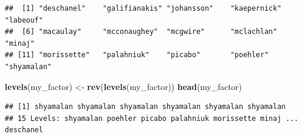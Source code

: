 \documentclass[
]{book}
\newenvironment{Shaded}{\begin{snugshade}}{\end{snugshade}}
\newcommand{\DataTypeTok}[1]{\textcolor[rgb]{0.13,0.29,0.53}{#1}}
\newcommand{\KeywordTok}[1]{\textcolor[rgb]{0.13,0.29,0.53}{\textbf{#1}}}
\newcommand{\NormalTok}[1]{#1}
\newcommand{\OperatorTok}[1]{\textcolor[rgb]{0.81,0.36,0.00}{\textbf{#1}}}
\newcommand{\StringTok}[1]{\textcolor[rgb]{0.31,0.60,0.02}{#1}}
\begin{document}
\begin{verbatim}
##  [1] "deschanel"    "galifianakis" "johansson"    "kaepernick"   "labeouf"     
##  [6] "macaulay"     "mcconaughey"  "mcgwire"      "mclachlan"    "minaj"       
## [11] "morissette"   "palahniuk"    "picabo"       "poehler"      "shyamalan"
\end{verbatim}

\begin{Shaded}
\begin{Highlighting}[]
\KeywordTok{levels}\NormalTok{(my_factor) <-}\StringTok{ }\KeywordTok{rev}\NormalTok{(}\KeywordTok{levels}\NormalTok{(my_factor))}
\KeywordTok{head}\NormalTok{(my_factor)}
\end{Highlighting}
\end{Shaded}

\begin{verbatim}
## [1] shyamalan shyamalan shyamalan shyamalan shyamalan shyamalan
## 15 Levels: shyamalan poehler picabo palahniuk morissette minaj ... deschanel
\end{verbatim}

\begin{Shaded}
\end{Shaded}
\end{document}
